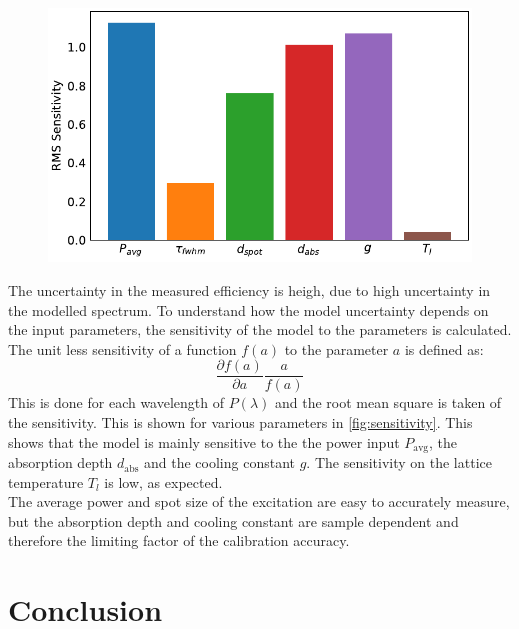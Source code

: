\documentclass[
	parskip=half,
	a4paper,
]{scrarticle}
\begin{document}
\begin{figure}
    \centering
    \includegraphics{../analysis/figures/sensitivity bars.pdf}
    \caption{}
    \label{fig:sensitivity}
\end{figure}
The uncertainty in the measured efficiency is heigh, due to high uncertainty in the modelled spectrum. To understand how the model uncertainty depends on the input parameters, the sensitivity of the model to the parameters is calculated.
The unit less sensitivity of a function $f(a)$ to the parameter $a$ is defined as: \[\frac{\partial f(a)}{\partial a} \frac{a}{f(a)}\]
This is done for each wavelength of $P(\lambda)$ and the root mean square is taken of the sensitivity. This is shown for various parameters in \autoref{fig:sensitivity}.
This shows that the model is mainly sensitive to the the power input $P_\text{avg}$, the absorption depth $d_\text{abs}$ and the cooling constant $g$. The sensitivity on the lattice temperature $T_l$ is low, as expected.\\
The average power and spot size of the excitation are easy to accurately measure, but the absorption depth and cooling constant are sample dependent and therefore the limiting factor of the calibration accuracy.

\section{Conclusion}

\clearpage
\printbibliography
\end{document}
